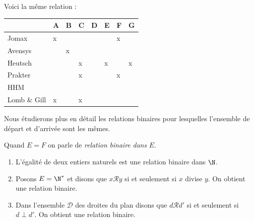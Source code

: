 \documentclass[a4paper,12pt,french]{book}
\begin{document}
\begin{exemple}

Voici la même relation :\\
\begin{center}
\begin{tabular}{|l|>{\centering\arraybackslash}m{1cm}|>{\centering\arraybackslash}m{1cm}|>{\centering\arraybackslash}m{1cm}|>{\centering\arraybackslash}m{1cm}|>{\centering\arraybackslash}m{1cm}|>{\centering\arraybackslash}m{1cm}|>{\centering\arraybackslash}m{1cm}|}
\hline
 & \cellcolor{lightgray}A &\cellcolor{lightgray} B &\cellcolor{lightgray} C &\cellcolor{lightgray} D &\cellcolor{lightgray} E &\cellcolor{lightgray} F &\cellcolor{lightgray} G \\
\hline
\cellcolor{lightgray}Jomax & x &  &  &  &  & x &  \\
\hline
\cellcolor{lightgray}Avensys &  & x &  &  &  &  &  \\
\hline
\cellcolor{lightgray}Heutsch &  &  & x &  & x &  & x \\
\hline
\cellcolor{lightgray}Prakter &  &  & x &  &  & x &  \\
\hline
\cellcolor{lightgray}HHM &  &  &  &  &  &  &  \\
\hline
\cellcolor{lightgray}Lomb \& Gill & x &  & x &  &  &  &  \\
\hline
\end{tabular}
\end{center}
\end{exemple}

Nous étudierons plus en détail les relations binaires pour lesquelles l'ensemble de départ et d'arrivée sont les mêmes.

\begin{definition}
	Quand $E=F$ on parle de \textit{relation binaire dans} $E$.
\end{definition}

\begin{exemple}[s]

\begin{enumerate}[--]
	\item 	L'égalité de deux entiers naturels est une relation binaire dans $\N$.
	\item 	Posons $E=\N^*$ et disons que $x\mathcal{R}y$ si et seulement si $x$ divise $y$. On obtient une relation binaire.
	\item 	Dans l'ensemble $\mathcal{D}$ des droites du plan disons que $d\mathcal{R}d'$ si et seulement si $d\perp d'$. On obtient une relation binaire.
\end{enumerate}
\end{exemple}
\end{document}
